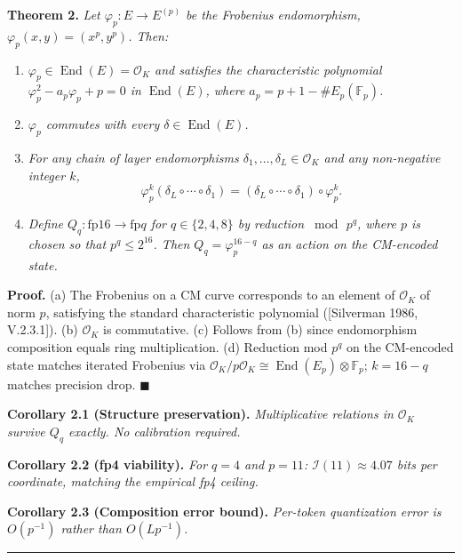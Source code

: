 \documentclass[
  11pt,
]{article}
\begin{document}
\textbf{Theorem 2.} \emph{Let \(\varphi_p : E \to E^{(p)}\) be the
Frobenius endomorphism, \(\varphi_p(x, y) = (x^p, y^p)\). Then:}

\begin{enumerate}
\def\labelenumi{(\alph{enumi})}
\item
  \emph{\(\varphi_p \in \operatorname{End}(E) = \mathcal{O}_K\) and
  satisfies the characteristic polynomial
  \(\varphi_p^2 - a_p \varphi_p + p = 0\) in \(\operatorname{End}(E)\),
  where \(a_p = p + 1 - \#E_p(\mathbb{F}_p)\).}
\item
  \emph{\(\varphi_p\) commutes with every
  \(\delta \in \operatorname{End}(E)\).}
\item
  \emph{For any chain of layer endomorphisms
  \(\delta_1, \dots, \delta_L \in \mathcal{O}_K\) and any non-negative
  integer \(k\),}
  \[\varphi_p^k(\delta_L \circ \cdots \circ \delta_1) = (\delta_L \circ \cdots \circ \delta_1) \circ \varphi_p^k.\]
\item
  \emph{Define \(Q_q : \mathrm{fp}16 \to \mathrm{fp}q\) for
  \(q \in \{2, 4, 8\}\) by reduction \(\bmod\, p^q\), where \(p\) is
  chosen so that \(p^q \leq 2^{16}\). Then \(Q_q = \varphi_p^{16 - q}\)
  as an action on the CM-encoded state.}
\end{enumerate}

\textbf{Proof.} (a) The Frobenius on a CM curve corresponds to an
element of \(\mathcal{O}_K\) of norm \(p\), satisfying the standard
characteristic polynomial ({[}Silverman 1986, V.2.3.1{]}). (b)
\(\mathcal{O}_K\) is commutative. (c) Follows from (b) since
endomorphism composition equals ring multiplication. (d) Reduction mod
\(p^q\) on the CM-encoded state matches iterated Frobenius via
\(\mathcal{O}_K / p\mathcal{O}_K \cong \operatorname{End}(E_p) \otimes \mathbb{F}_p\);
\(k = 16 - q\) matches precision drop. \(\blacksquare\)

\textbf{Corollary 2.1 (Structure preservation).} \emph{Multiplicative
relations in \(\mathcal{O}_K\) survive \(Q_q\) exactly. No calibration
required.}

\textbf{Corollary 2.2 (fp4 viability).} \emph{For \(q = 4\) and
\(p = 11\): \(\mathcal{I}(11) \approx 4.07\) bits per coordinate,
matching the empirical fp4 ceiling.}

\textbf{Corollary 2.3 (Composition error bound).} \emph{Per-token
quantization error is \(O(p^{-1})\) rather than \(O(L p^{-1})\).}

\begin{center}\rule{0.5\linewidth}{0.5pt}\end{center}
\end{document}
